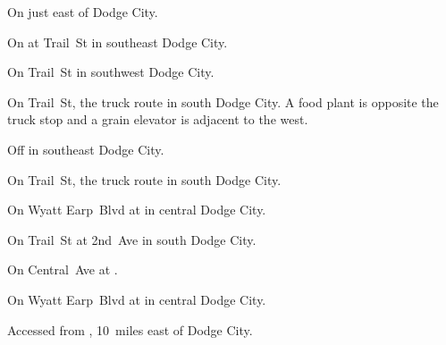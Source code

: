 

\begin{LocationList}

On  just east of Dodge City.

On  at Trail~St in southeast Dodge City.

On Trail~St in southwest Dodge City.

On Trail~St, the truck route in south Dodge City.
A food plant is opposite the truck stop and a grain elevator is adjacent to the west.

Off  in southeast Dodge City.

On Trail~St, the truck route in south Dodge City.

On Wyatt Earp~Blvd at   in central Dodge City.

On Trail~St at 2nd~Ave in south Dodge City.

On Central~Ave at .

\Location{\TruckStop \Gas \Rest}
On Wyatt Earp~Blvd at   in central Dodge City.

Accessed from , 10~miles east of Dodge City.

\end{LocationList}

